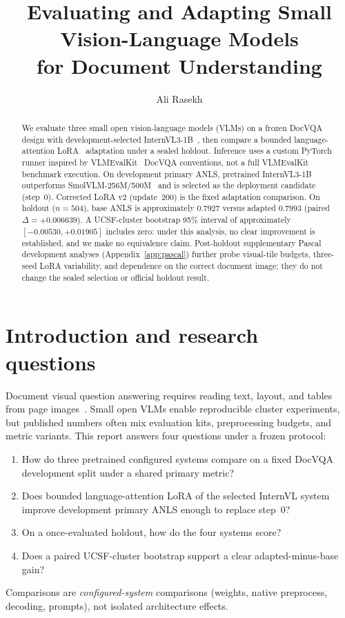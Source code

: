 \documentclass[11pt,a4paper]{article}
\title{Evaluating and Adapting Small Vision-Language Models\\for Document Understanding}
\author{Ali Rasekh}
\date{}
\begin{document}
\maketitle

\begin{abstract}
We evaluate three small open vision-language models (VLMs) on a frozen DocVQA~\citep{mathew2021docvqa} design with development-selected InternVL3-1B~\citep{zhu2025internvl3,opengvlab2025internvl3_1b_card}, then compare a bounded language-attention LoRA~\citep{hu2022lora} adaptation under a sealed holdout.
Inference uses a custom PyTorch runner inspired by VLMEvalKit~\citep{duan2024vlmevalkit} DocVQA conventions, not a full VLMEvalKit benchmark execution.
On development primary ANLS, pretrained InternVL3-1B outperforms SmolVLM-256M/500M~\citep{marafioti2025smolvlm} and is selected as the deployment candidate (step~0).
Corrected LoRA v2 (update~200) is the fixed adaptation comparison.
On holdout ($n{=}504$), base ANLS is approximately $0.7927$ versus adapted $0.7993$ (paired $\Delta{=}{+}0.006639$).
A UCSF-cluster bootstrap 95\% interval of approximately $[{-}0.00530,{+}0.01905]$ includes zero: under this analysis, no clear improvement is established, and we make no equivalence claim.
Post-holdout supplementary Pascal development analyses (Appendix~\ref{app:pascal}) further probe visual-tile budgets, three-seed LoRA variability, and dependence on the correct document image; they do not change the sealed selection or official holdout result.
\end{abstract}

\section{Introduction and research questions}

Document visual question answering requires reading text, layout, and tables from page images~\citep{mathew2021docvqa}.
Small open VLMs enable reproducible cluster experiments, but published numbers often mix evaluation kits, preprocessing budgets, and metric variants.
This report answers four questions under a frozen protocol:
\begin{enumerate}[leftmargin=1.2em,itemsep=0.15em]
  \item How do three pretrained configured systems compare on a fixed DocVQA development split under a shared primary metric?
  \item Does bounded language-attention LoRA of the selected InternVL system improve development primary ANLS enough to replace step~0?
  \item On a once-evaluated holdout, how do the four systems score?
  \item Does a paired UCSF-cluster bootstrap support a clear adapted-minus-base gain?
\end{enumerate}
Comparisons are \emph{configured-system} comparisons (weights, native preprocess, decoding, prompts), not isolated architecture effects.
\end{document}
